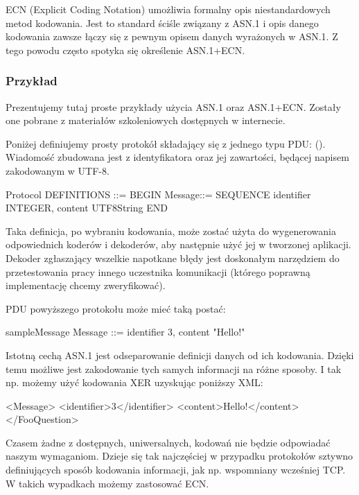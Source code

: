\documentclass[00-praca-magisterska.tex]{subfiles}
\begin{document}
ECN (Explicit Coding Notation) umożliwia formalny opis niestandardowych metod
kodowania. Jest to standard ściśle związany z ASN.1 i opis danego kodowania
zawsze łączy się z pewnym opisem danych wyrażonych w ASN.1. Z tego powodu często
spotyka się określenie ASN.1+ECN.

\subsubsection{Przykład}

Prezentujemy tutaj proste przykłady użycia ASN.1 oraz ASN.1+ECN. Zostały one
pobrane z materiałów szkoleniowych dostępnych w internecie. 

Poniżej definiujemy prosty protokół składający się z jednego typu PDU:
(). Wiadomość zbudowana jest z identyfikatora oraz jej
zawartości, będącej napisem zakodowanym w UTF-8.

\begin{textcode}
  Protocol DEFINITIONS ::= BEGIN
       Message::= SEQUENCE {
          identifier INTEGER,
          content    UTF8String
      }
  END
\end{textcode}

Taka definicja, po wybraniu kodowania, może zostać użyta do wygenerowania
odpowiednich koderów i dekoderów, aby następnie użyć jej w tworzonej aplikacji.
Dekoder zgłaszający wszelkie napotkane błędy jest doskonałym narzędziem do
przetestowania pracy innego uczestnika komunikacji (którego poprawną
implementację chcemy zweryfikować).

PDU powyższego protokołu może mieć taką postać:

\begin{textcode}
  sampleMessage Message ::= {
      identifier     3,
      content        "Hello!"
  }
\end{textcode}

Istotną cechą ASN.1 jest odseparowanie definicji danych od ich kodowania.
Dzięki temu możliwe jest zakodowanie tych samych informacji na różne sposoby. I
tak np. możemy użyć kodowania XER uzyskując poniższy XML:

\begin{xmlcode}
  <Message>
      <identifier>3</identifier>
      <content>Hello!</content>
  </FooQuestion>
\end{xmlcode}

Czasem żadne z dostępnych, uniwersalnych, kodowań nie będzie odpowiadać naszym
wymaganiom. Dzieje się tak najczęściej w przypadku protokołów sztywno
definiujących sposób kodowania informacji, jak np. wspomniany wcześniej TCP. W
takich wypadkach możemy zastosować ECN.
\end{document}
